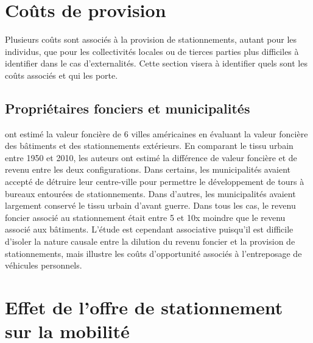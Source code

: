\section{Coûts de provision}
Plusieurs coûts sont associés à la provision de stationnements, autant pour les individus, que pour les collectivités locales ou de tierces parties plus difficiles à identifier dans le cas d'externalités. Cette section visera à identifier quels sont les coûts associés et qui les porte.

\subsection{Propriétaires fonciers et municipalités}

\textcite{Blanc:EffectsUrban:2014} ont estimé la valeur foncière de 6 villes américaines en évaluant la valeur foncière des bâtiments et des stationnements extérieurs. En comparant le tissu urbain entre 1950 et 2010, les auteurs ont estimé la différence de valeur foncière et de revenu entre les deux configurations. Dans certains, les municipalités avaient accepté de détruire leur centre-ville pour permettre le développement de tours à bureaux entourées de stationnements. Dans d'autres, les municipalités avaient largement conservé le tissu urbain d'avant guerre. Dans tous les cas, le revenu foncier associé au stationnement était entre 5 et 10x moindre que le revenu associé aux bâtiments. L'étude est cependant associative puisqu'il est difficile d'isoler la nature causale entre la dilution du revenu foncier et la provision de stationnements, mais illustre les coûts d'opportunité associés à l'entreposage de véhicules personnels. \par

\section{Effet de l'offre de stationnement sur la mobilité}

